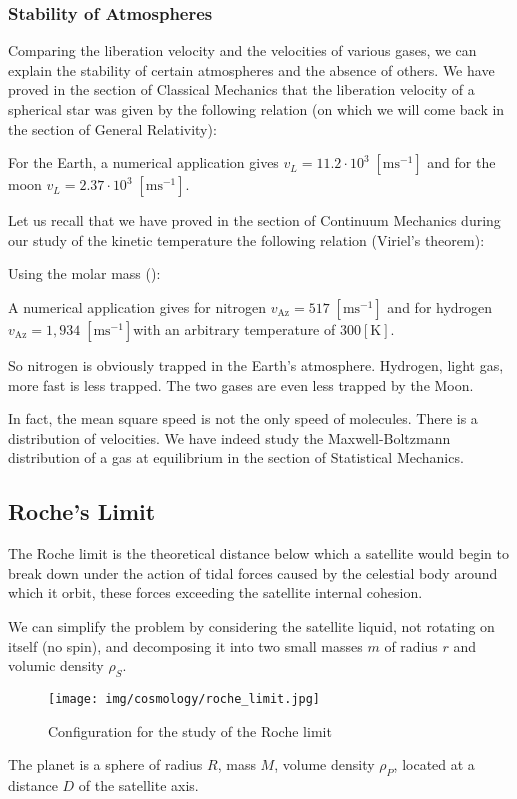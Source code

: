 	\subsubsection{Stability of Atmospheres}
	Comparing the liberation velocity and the velocities of various gases, we can explain the stability of certain atmospheres and the absence of others. We have proved in the section of Classical Mechanics that the liberation velocity of a spherical star was given by the following relation (on which we will come back in the section of General Relativity):
	
	For the Earth, a numerical application gives $v_L=11.2\cdot 10^3\;[\text{ms}^{-1}]$ and for the moon $v_L=2.37\cdot 10^3\;[\text{ms}^{-1}]$.

	Let us recall that we have proved in the section of Continuum Mechanics during our study of the kinetic temperature the following relation (Viriel's theorem):
	
	Using the molar mass ():
	
	A numerical application gives for nitrogen $v_\text{Az}=517\;[\text{ms}^{-1}]$ and for hydrogen $v_\text{Az}=1,934\;[\text{ms}^{-1}]$with an arbitrary temperature of $300 [\text{K}]$.
	
	So nitrogen is obviously trapped in the Earth's atmosphere. Hydrogen, light gas, more fast is less trapped. The two gases are even less trapped by the Moon.
	\begin{tcolorbox}[title=Remark,colframe=black,arc=10pt]
	In fact, the mean square speed is not the only speed of molecules. There is a distribution of velocities. We have indeed study the Maxwell-Boltzmann distribution of a gas at equilibrium in the section of Statistical Mechanics.
	\end{tcolorbox}
	

	\pagebreak	
	\subsection{Roche's Limit}
	The Roche limit is the theoretical distance below which a satellite would begin to break down under the action of tidal forces caused by the celestial body around which it orbit, these forces exceeding the satellite internal cohesion.
	
	We can simplify the problem by considering the satellite liquid, not rotating on itself (no spin), and decomposing it into two small masses $m$ of radius $r$ and volumic density $\rho_S$.
	\begin{figure}[H]
		\begin{center}
		\texttt{[image: img/cosmology/roche\_limit.jpg]}
		\end{center}	
		\caption{Configuration for the study of the Roche limit}
	\end{figure}
	The planet is a sphere of radius $R$, mass $M$,  volume density $\rho_P$, located at a distance $D$ of the satellite axis.
	
